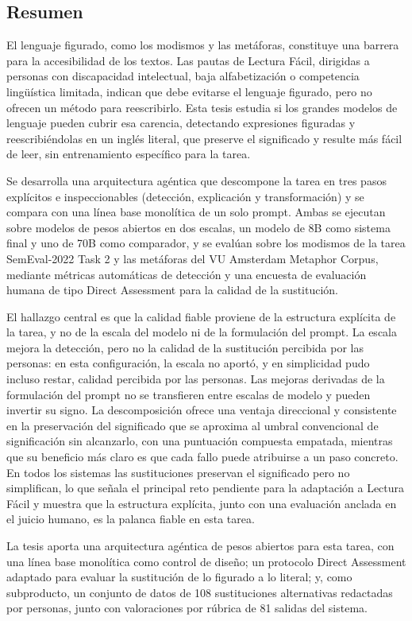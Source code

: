 \vspace*{15em}

\begin{center}
    \section*{Resumen}

    El lenguaje figurado, como los modismos y las metáforas, constituye una barrera para la accesibilidad de los textos. Las pautas de Lectura Fácil, dirigidas a personas con discapacidad intelectual, baja alfabetización o competencia lingüística limitada, indican que debe evitarse el lenguaje figurado, pero no ofrecen un método para reescribirlo. Esta tesis estudia si los grandes modelos de lenguaje pueden cubrir esa carencia, detectando expresiones figuradas y reescribiéndolas en un inglés literal, que preserve el significado y resulte más fácil de leer, sin entrenamiento específico para la tarea.

    Se desarrolla una arquitectura agéntica que descompone la tarea en tres pasos explícitos e inspeccionables (detección, explicación y transformación) y se compara con una línea base monolítica de un solo prompt. Ambas se ejecutan sobre modelos de pesos abiertos en dos escalas, un modelo de 8B como sistema final y uno de 70B como comparador, y se evalúan sobre los modismos de la tarea SemEval-2022 Task 2 y las metáforas del VU Amsterdam Metaphor Corpus, mediante métricas automáticas de detección y una encuesta de evaluación humana de tipo Direct Assessment para la calidad de la sustitución.

    El hallazgo central es que la calidad fiable proviene de la estructura explícita de la tarea, y no de la escala del modelo ni de la formulación del prompt. La escala mejora la detección, pero no la calidad de la sustitución percibida por las personas: en esta configuración, la escala no aportó, y en simplicidad pudo incluso restar, calidad percibida por las personas. Las mejoras derivadas de la formulación del prompt no se transfieren entre escalas de modelo y pueden invertir su signo. La descomposición ofrece una ventaja direccional y consistente en la preservación del significado que se aproxima al umbral convencional de significación sin alcanzarlo, con una puntuación compuesta empatada, mientras que su beneficio más claro es que cada fallo puede atribuirse a un paso concreto. En todos los sistemas las sustituciones preservan el significado pero no simplifican, lo que señala el principal reto pendiente para la adaptación a Lectura Fácil y muestra que la estructura explícita, junto con una evaluación anclada en el juicio humano, es la palanca fiable en esta tarea.

    La tesis aporta una arquitectura agéntica de pesos abiertos para esta tarea, con una línea base monolítica como control de diseño; un protocolo Direct Assessment adaptado para evaluar la sustitución de lo figurado a lo literal; y, como subproducto, un conjunto de datos de 108 sustituciones alternativas redactadas por personas, junto con valoraciones por rúbrica de 81 salidas del sistema.

\end{center}

{}

\newpage